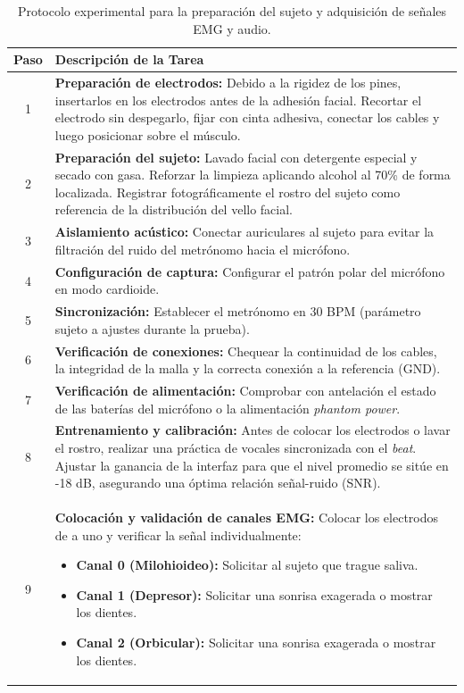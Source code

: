 \documentclass[12pt, a4paper]{article}
\begin{document}
\begin{table}[H]
    \centering
    \caption{Protocolo experimental para la preparación del sujeto y adquisición de señales EMG y audio.}
    \label{tab:protocolo_emg}
    \renewcommand{\arraystretch}{1.5} %
    \begin{tabular}{c p{13cm}}
        \toprule
        \textbf{Paso} & \textbf{Descripción de la Tarea} \\
        \midrule
        1 & \textbf{Preparación de electrodos:} Debido a la rigidez de los pines, insertarlos en los electrodos antes de la adhesión facial. Recortar el electrodo sin despegarlo, fijar con cinta adhesiva, conectar los cables y luego posicionar sobre el músculo. \\
        2 & \textbf{Preparación del sujeto:} Lavado facial con detergente especial y secado con gasa. Reforzar la limpieza aplicando alcohol al 70\% de forma localizada. Registrar fotográficamente el rostro del sujeto como referencia de la distribución del vello facial. \\
        3 & \textbf{Aislamiento acústico:} Conectar auriculares al sujeto para evitar la filtración del ruido del metrónomo hacia el micrófono. \\
        4 & \textbf{Configuración de captura:} Configurar el patrón polar del micrófono en modo cardioide. \\
        5 & \textbf{Sincronización:} Establecer el metrónomo en 30 BPM (parámetro sujeto a ajustes durante la prueba). \\
        6 & \textbf{Verificación de conexiones:} Chequear la continuidad de los cables, la integridad de la malla y la correcta conexión a la referencia (GND). \\
        7 & \textbf{Verificación de alimentación:} Comprobar con antelación el estado de las baterías del micrófono o la alimentación \textit{phantom power}. \\
        8 & \textbf{Entrenamiento y calibración:} Antes de colocar los electrodos o lavar el rostro, realizar una práctica de vocales sincronizada con el \textit{beat}. Ajustar la ganancia de la interfaz para que el nivel promedio se sitúe en -18 dB, asegurando una óptima relación señal-ruido (SNR). \\
        9 & \textbf{Colocación y validación de canales EMG:} Colocar los electrodos de a uno y verificar la señal individualmente:
        \vspace{-2mm}
        \begin{itemize} \setlength{\itemsep}{0pt}
            \item \textbf{Canal 0 (Milohioideo):} Solicitar al sujeto que trague saliva.
            \item \textbf{Canal 1 (Depresor):} Solicitar una sonrisa exagerada o mostrar los dientes.
            \item \textbf{Canal 2 (Orbicular):} Solicitar una sonrisa exagerada o mostrar los dientes.
        \end{itemize} \\
        \bottomrule
    \end{tabular}
\end{table}
\end{document}
